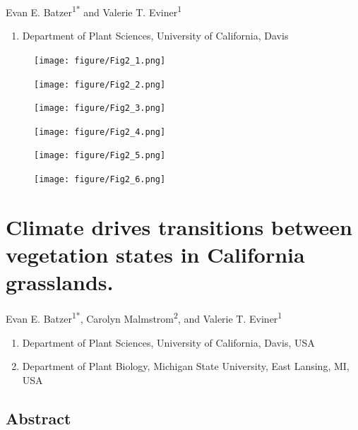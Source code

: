 \documentclass[twoside,12pt,final]{ucthesis-CA2012}
\providecommand{\tightlist}{%
  \setlength{\itemsep}{0pt}\setlength{\parskip}{0pt}}
\begin{document}
\begin{ucmainmatter}
Evan E. Batzer\textsuperscript{1*} and Valerie T. Eviner\textsuperscript{1}
\begin{enumerate}
\def\labelenumi{\arabic{enumi}.}
\tightlist
\item
  Department of Plant Sciences, University of California, Davis
\end{enumerate}
\begin{figure}
\centering
\texttt{[image: figure/Fig2\_1.png]}
\caption{\label{fig-2-1}}
\end{figure}
\begin{figure}
\centering
\texttt{[image: figure/Fig2\_2.png]}
\caption{\label{fig-2-2}}
\end{figure}
\begin{figure}
\centering
\texttt{[image: figure/Fig2\_3.png]}
\caption{\label{fig-2-3}}
\end{figure}
\begin{figure}
\centering
\texttt{[image: figure/Fig2\_4.png]}
\caption{\label{fig-2-4}}
\end{figure}
\begin{figure}
\centering
\texttt{[image: figure/Fig2\_5.png]}
\caption{\label{fig-2-5}}
\end{figure}
\begin{figure}
\centering
\texttt{[image: figure/Fig2\_6.png]}
\caption{\label{fig-2-6}}
\end{figure}
\hypertarget{climate-drives-transitions-between-vegetation-states-in-california-grasslands.}{%
\chapter{Climate drives transitions between vegetation states in California grasslands.}\label{climate-drives-transitions-between-vegetation-states-in-california-grasslands.}}


Evan E. Batzer\textsuperscript{1*},
Carolyn Malmstrom\textsuperscript{2},
and Valerie T. Eviner\textsuperscript{1}
\begin{enumerate}
\def\labelenumi{\arabic{enumi}.}
\tightlist
\item
  Department of Plant Sciences, University of California, Davis, USA
\item
  Department of Plant Biology, Michigan State University, East Lansing, MI, USA
\end{enumerate}
\hypertarget{abstract}{%
\section{Abstract}\label{abstract}}


\end{ucmainmatter}
\end{document}
